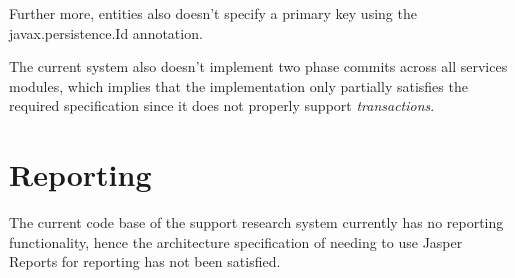 \documentclass[a4paper,10pt]{article}
\begin{document}
Further more, entities also doesn't specify a primary key using the javax.persistence.Id annotation.

The current system also doesn't implement two phase commits across all services modules, which implies that the implementation only partially satisfies the required specification since it does not 
properly support \textit{transactions}.

\section{Reporting}
The current code base of the support research system currently has no reporting functionality, hence the architecture specification of needing to use Jasper Reports for reporting has not been satisfied.
\end{document}

